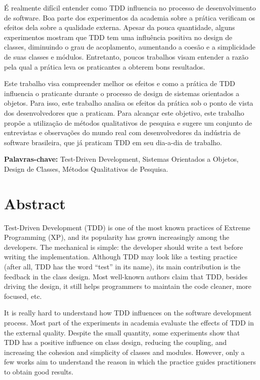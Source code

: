 \documentclass[11pt,twoside,a4paper]{book}
\begin{document}
É realmente difícil entender como TDD influencia no processo de desenvolvimento
de software. Boa parte dos experimentos da
academia sobre a prática verificam os efeitos dela sobre a qualidade externa. 
Apesar da pouca quantidade, alguns experimentos mostram que TDD tem uma influência
positiva no design de classes, diminuindo o grau de acoplamento, aumentando
a coesão e a simplicidade de suas classes e módulos. Entretanto, poucos trabalhos visam
entender a razão pela qual a prática leva os praticantes a obterem bons resultados.

Este trabalho visa compreender melhor os efeitos e como a prática de TDD influencia o 
praticante durante o processo de design de sistemas orientados a objetos. Para isso, 
este trabalho analisa os efeitos da prática sob o ponto de vista dos desenvolvedores que 
a praticam. Para alcançar este objetivo, este trabalho propõe a utilização de métodos 
qualitativos de pesquisa e sugere um conjunto de entrevistas e observações do mundo 
real com desenvolvedores da indústria de software  brasileira, que já praticam 
TDD em seu dia-a-dia de trabalho.

\noindent \textbf{Palavras-chave:} Test-Driven Development, Sistemas Orientados
a Objetos, Design de Classes, Métodos Qualitativos de Pesquisa.

\chapter*{Abstract}

Test-Driven Development (TDD) is one of the most known practices of Extreme
Programming (XP), and its popularity has grown increasingly among the
developers. The mechanical is simple: the developer should write a test before
writing the implementation. Although TDD may look like a testing practice
(after all, TDD has the word ``test'' in its name), its main contribution is the
feedback in the class design. Most well-known authors claim that TDD, besides
driving the design, it still helps programmers to maintain the code cleaner,
more focused, etc.

It is really hard to understand how TDD influences on the software development
process. Most part of the experiments in academia evaluate the effects of TDD
in the external quality. Despite the small quantity, some experiments
show that TDD has a positive influence on class design, reducing the coupling, and
increasing the cohesion and simplicity of classes and modules. However, only a
few works aim to understand the reason in which the practice guides practitioners
to obtain good results.
\end{document}
